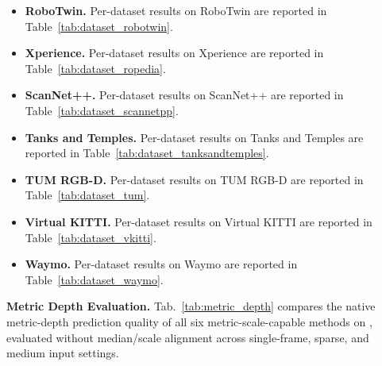 \begin{itemize}
  \item \textbf{RoboTwin.} Per-dataset results on RoboTwin are reported in Table~\ref{tab:dataset_robotwin}.
  \item \textbf{Xperience.} Per-dataset results on Xperience are reported in Table~\ref{tab:dataset_ropedia}.
  \item \textbf{ScanNet++.} Per-dataset results on ScanNet++ are reported in Table~\ref{tab:dataset_scannetpp}.
  \item \textbf{Tanks and Temples.} Per-dataset results on Tanks and Temples are reported in Table~\ref{tab:dataset_tanksandtemples}.
  \item \textbf{TUM RGB-D.} Per-dataset results on TUM RGB-D are reported in Table~\ref{tab:dataset_tum}.
  \item \textbf{Virtual KITTI.} Per-dataset results on Virtual KITTI are reported in Table~\ref{tab:dataset_vkitti}.
  \item \textbf{Waymo.} Per-dataset results on Waymo are reported in Table~\ref{tab:dataset_waymo}.
\end{itemize}

\noindent\textbf{Metric Depth Evaluation.}
Tab.~\ref{tab:metric_depth} compares the native metric-depth prediction quality of all six metric-scale-capable methods on \benchmark, evaluated without median/scale alignment across single-frame, sparse, and medium input settings.





\clearpage

%
%
%
%




















\clearpage


